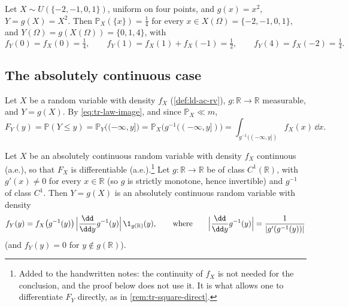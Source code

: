 \begin{example}\label{exa:tr-discrete-square}
Let $X\sim U(\{-2,-1,0,1\})$, uniform on four points, and $g(x)=x^2$, $Y=g(X)=X^2$. Then
$\mathbb P_X(\{x\})=\frac14$ for every $x\in X(\Omega)=\{-2,-1,0,1\}$, and
$Y(\Omega)=g(X(\Omega))=\{0,1,4\}$, with
\[
  f_Y(0)=f_X(0)=\tfrac14,\qquad f_Y(1)=f_X(1)+f_X(-1)=\tfrac12,\qquad f_Y(4)=f_X(-2)=\tfrac14 .
\]
\end{example}

\subsection{The absolutely continuous case}\label{sec:tr-ac-case}

Let $X$ be a random variable with density $f_X$ (\cref{def:ld-ac-rv}), $g:\mathbb R\to\mathbb R$
measurable, and $Y=g(X)$. By \eqref{eq:tr-law-image}, and since $\mathbb P_X\ll m$,
\begin{equation}\label{eq:tr-cdf-image}
  F_Y(y)=\mathbb P(Y\le y)=\mathbb P_Y\big((-\infty,y]\big)=\mathbb P_X\big(g^{-1}((-\infty,y])\big)
  =\int_{g^{-1}((-\infty,y])}f_X(x)\,\dd x .
\end{equation}

\begin{proposition}[Density of $g(X)$]\label{thm:tr-density}
Let $X$ be an absolutely continuous random variable with density $f_X$ continuous (a.e.), so that
$F_X$ is differentiable (a.e.).\footnote{Added to the handwritten notes: the continuity of $f_X$ is
not needed for the conclusion, and the proof below does not use it. It is what allows one to
differentiate $F_Y$ directly, as in \cref{rem:tr-square-direct}.} Let $g:\mathbb R\to\mathbb R$ be
of class $C^1(\mathbb R)$, with $g'(x)\ne0$ for every $x\in\mathbb R$ (so $g$ is strictly monotone,
hence invertible) and $g^{-1}$ of class $C^1$. Then $Y=g(X)$ is an absolutely continuous random
variable with density
\[
  f_Y(y)=f_X\big(g^{-1}(y)\big)\,\Big|\frac{\dd}{\dd y}g^{-1}(y)\Big|\,\1_{g(\mathbb R)}(y),
  \qquad\text{where}\qquad \Big|\frac{\dd}{\dd y}g^{-1}(y)\Big|=\frac1{|g'(g^{-1}(y))|}
\]
(and $f_Y(y)=0$ for $y\notin g(\mathbb R)$).
\end{proposition}

